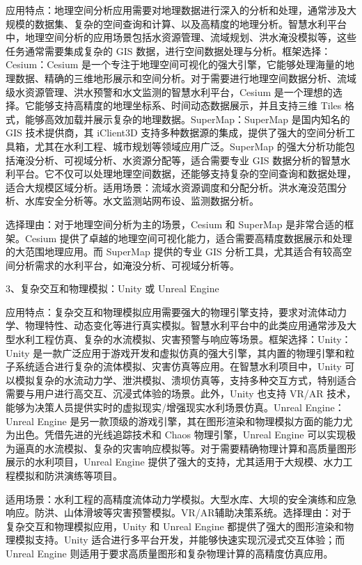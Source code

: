 应用特点：地理空间分析应用需要对地理数据进行深入的分析和处理，通常涉及大规模的数据集、复杂的空间查询和计算、以及高精度的地理分析。智慧水利平台中，地理空间分析的应用场景包括水资源管理、流域规划、洪水淹没模拟等，这些任务通常需要集成复杂的 GIS 数据，进行空间数据处理与分析。框架选择：Cesium：Cesium 是一个专注于地理空间可视化的强大引擎，它能够处理海量的地理数据、精确的三维地形展示和空间分析。对于需要进行地理空间数据分析、流域级水资源管理、洪水预警和水文监测的智慧水利平台，Cesium 是一个理想的选择。它能够支持高精度的地理坐标系、时间动态数据展示，并且支持三维 Tiles 格式，能够高效加载并展示复杂的地理数据。SuperMap：SuperMap 是国内知名的 GIS 技术提供商，其 iClient3D 支持多种数据源的集成，提供了强大的空间分析工具箱，尤其在水利工程、城市规划等领域应用广泛。SuperMap 的强大分析功能包括淹没分析、可视域分析、水资源分配等，适合需要专业 GIS 数据分析的智慧水利平台。它不仅可以处理地理空间数据，还能够支持复杂的空间查询和数据处理，适合大规模区域分析。适用场景：流域水资源调度和分配分析。洪水淹没范围分析、水库安全分析等。水文监测站网布设、监测数据分析。

选择理由：对于地理空间分析为主的场景，Cesium 和 SuperMap 是非常合适的框架。Cesium 提供了卓越的地理空间可视化能力，适合需要高精度数据展示和处理的大范围地理应用。而 SuperMap 提供的专业 GIS 分析工具，尤其适合有较高空间分析需求的水利平台，如淹没分析、可视域分析等。

3、复杂交互和物理模拟：Unity 或 Unreal Engine

应用特点：复杂交互和物理模拟应用需要强大的物理引擎支持，要求对流体动力学、物理特性、动态变化等进行真实模拟。智慧水利平台中的此类应用通常涉及大型水利工程仿真、复杂的水流模拟、灾害预警与响应等场景。框架选择：Unity：Unity 是一款广泛应用于游戏开发和虚拟仿真的强大引擎，其内置的物理引擎和粒子系统适合进行复杂的流体模拟、灾害仿真等应用。在智慧水利项目中，Unity 可以模拟复杂的水流动力学、泄洪模拟、溃坝仿真等，支持多种交互方式，特别适合需要与用户进行高交互、沉浸式体验的场景。此外，Unity 也支持 VR/AR 技术，能够为决策人员提供实时的虚拟现实/增强现实水利场景仿真。Unreal Engine：Unreal Engine 是另一款顶级的游戏引擎，其在图形渲染和物理模拟方面的能力尤为出色。凭借先进的光线追踪技术和 Chaos 物理引擎，Unreal Engine 可以实现极为逼真的水流模拟、复杂的灾害响应模拟等。对于需要精确物理计算和高质量图形展示的水利项目，Unreal Engine 提供了强大的支持，尤其适用于大规模、水力工程模拟和防洪演练等项目。

适用场景：水利工程的高精度流体动力学模拟。大型水库、大坝的安全演练和应急响应。防洪、山体滑坡等灾害预警模拟。VR/AR辅助决策系统。选择理由：对于复杂交互和物理模拟应用，Unity 和 Unreal Engine 都提供了强大的图形渲染和物理模拟支持。Unity 适合进行多平台开发，并能够快速实现沉浸式交互体验；而 Unreal Engine 则适用于要求高质量图形和复杂物理计算的高精度仿真应用。

